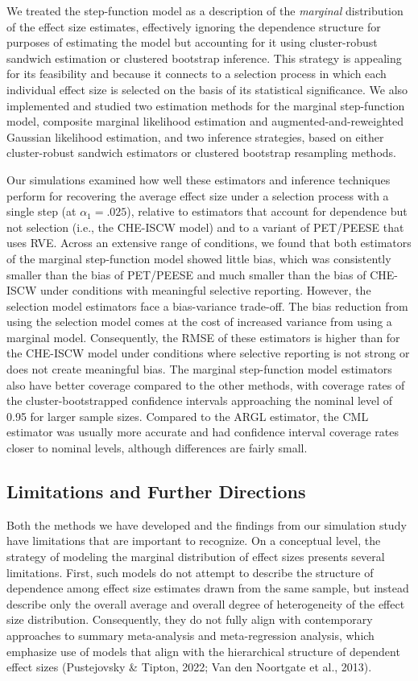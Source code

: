 \documentclass[
  man, donotrepeattitle,floatsintext]{apa7}
\begin{document}
We treated the step-function model as a description of the \emph{marginal} distribution of the effect size estimates, effectively ignoring the dependence structure for purposes of estimating the model but accounting for it using cluster-robust sandwich estimation or clustered bootstrap inference.
This strategy is appealing for its feasibility and because it connects to a selection process in which each individual effect size is selected on the basis of its statistical significance.
We also implemented and studied two estimation methods for the marginal step-function model, composite marginal likelihood estimation and augmented-and-reweighted Gaussian likelihood estimation, and two inference strategies, based on either cluster-robust sandwich estimators or clustered bootstrap resampling methods.

Our simulations examined how well these estimators and inference techniques perform for recovering the average effect size under a selection process with a single step (at \(\alpha_1 = .025\)), relative to estimators that account for dependence but not selection (i.e., the CHE-ISCW model) and to a variant of PET/PEESE that uses RVE.
Across an extensive range of conditions, we found that both estimators of the marginal step-function model showed little bias, which was consistently smaller than the bias of PET/PEESE and much smaller than the bias of CHE-ISCW under conditions with meaningful selective reporting.
However, the selection model estimators face a bias-variance trade-off. The bias reduction from using the selection model comes at the cost of increased variance from using a marginal model. Consequently, the RMSE of these estimators is higher than for the CHE-ISCW model under conditions where selective reporting is not strong or does not create meaningful bias. The marginal step-function model estimators also have better coverage compared to the other methods, with coverage rates of the cluster-bootstrapped confidence intervals approaching the nominal level of 0.95 for larger sample sizes. Compared to the ARGL estimator, the CML estimator was usually more accurate and had confidence interval coverage rates closer to nominal levels, although differences are fairly small.

\subsection{Limitations and Further Directions}\label{limitations-and-further-directions}

Both the methods we have developed and the findings from our simulation study have limitations that are important to recognize.
On a conceptual level, the strategy of modeling the marginal distribution of effect sizes presents several limitations.
First, such models do not attempt to describe the structure of dependence among effect size estimates drawn from the same sample, but instead describe only the overall average and overall degree of heterogeneity of the effect size distribution.
Consequently, they do not fully align with contemporary approaches to summary meta-analysis and meta-regression analysis, which emphasize use of models that align with the hierarchical structure of dependent effect sizes (Pustejovsky \& Tipton, 2022; Van den Noortgate et al., 2013).
\end{document}
